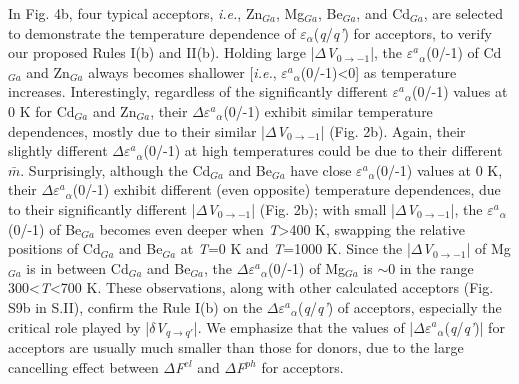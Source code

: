 \documentclass[onecolumn,preprint,superscriptaddress]{revtex4-1}
\begin{document}
In Fig. 4b, four typical acceptors, \emph{i.e.}, Zn$_{Ga}$, Mg$_{Ga}$, Be$_{Ga}$, and Cd$_{Ga}$, are selected to demonstrate the temperature dependence of $\varepsilon$$_{\alpha}$(\emph{q}/\emph{q'}) for acceptors, to verify our proposed Rules I(b) and II(b). Holding large |$\Delta$\emph{V}$_{0\rightarrow -1}$|, the $\varepsilon$$^{a}$$_{\alpha}$(0/-1) of Cd$_{Ga}$ and Zn$_{Ga}$ always becomes shallower [\emph{i.e.}, $\varepsilon$$^{a}$$_{\alpha}$(0/-1)<0] as temperature increases. Interestingly, regardless of the significantly different $\varepsilon$$^{a}$$_{\alpha}$(0/-1) values at 0 K for Cd$_{Ga}$ and Zn$_{Ga}$, their $\Delta$$\varepsilon$$^{a}$$_{\alpha}$(0/-1) exhibit similar temperature dependences, mostly due to their similar |$\Delta$\emph{V}$_{0\rightarrow -1}$| (Fig. 2b). Again, their slightly different $\Delta$$\varepsilon$$^{a}$$_{\alpha}$(0/-1) at high temperatures could be due to their different $\bar{m}$. Surprisingly, although the Cd$_{Ga}$ and Be$_{Ga}$ have close $\varepsilon$$^{a}$$_{\alpha}$(0/-1) values at 0 K, their $\Delta$$\varepsilon$$^{a}$$_{\alpha}$(0/-1) exhibit different (even opposite) temperature dependences, due to their significantly different |$\Delta$\emph{V}$_{0\rightarrow -1}$| (Fig. 2b); with small |$\Delta$\emph{V}$_{0\rightarrow -1}$|, the $\varepsilon$$^{a}$$_{\alpha}$(0/-1) of Be$_{Ga}$ becomes even deeper when \emph{T}>400 K, swapping the relative positions of Cd$_{Ga}$ and Be$_{Ga}$ at \emph{T}=0 K and \emph{T}=1000 K. Since the |$\Delta$\emph{V}$_{0\rightarrow -1}$| of Mg$_{Ga}$ is in between Cd$_{Ga}$ and Be$_{Ga}$, the $\Delta$$\varepsilon$$^{a}$$_{\alpha}$(0/-1) of Mg$_{Ga}$ is $\sim$0 in the range 300<\emph{T}<700 K. These observations, along with other calculated acceptors (Fig. S9b in S.II), confirm the Rule I(b) on the $\Delta$$\varepsilon$$^{a}$$_{\alpha}$(\emph{q}/\emph{q'}) of acceptors, especially the critical role played by |$\delta$\emph{V}$_{q\rightarrow q'}$|. We emphasize that the values of |$\Delta$$\varepsilon$$^{a}$$_{\alpha}$(\emph{q}/\emph{q'})| for acceptors are usually much smaller than those for donors, due to the large cancelling effect between $\Delta$\emph{F}$^{el}$ and $\Delta$\emph{F}$^{ph}$ for acceptors.
\end{document}
